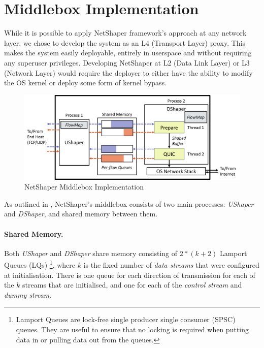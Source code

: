 \section{Middlebox Implementation}
\label{sec:netshaper-middlebox-implementation}

While it is possible to apply NetShaper framework's approach at any network layer, we chose to develop the system as an L4 (Transport Layer) proxy.
This makes the system easily deployable, entirely in userspace and without requiring any superuser privileges. 
Developing NetShaper at L2 (Data Link Layer) or L3 (Network Layer) would require the deployer to either have the ability to modify the OS kernel or deploy some form of kernel bypass.

\begin{figure}[!htb]
    \centering
    \includegraphics[width=\columnwidth]{figures/netshaper/middlebox-implementation.png}
    \caption{NetShaper Middlebox Implementation}
    \label{fig:middlebox-implementation}
\end{figure}

As outlined in , NetShaper's middlebox consists of two main processes: \textit{UShaper} and \textit{DShaper}, and shared memory between them.

\paragraph{Shared Memory.}
Both \textit{UShaper} and \textit{DShaper} share memory consisting of $2*(k + 2)$ Lamport Queues (LQs) \cite{lamportqueue}
\footnote{Lamport Queues are lock-free single producer single consumer (SPSC) queues. They are useful to ensure that no locking is required when putting data in or pulling data out from the queues.}, 
where $k$ is the fixed number of \textit{data streams} that were configured at initialisation.
There is one queue for each direction of transmission for each of the $k$ streams that are initialised, and one for each of the \textit{control stream} and \textit{dummy stream}.

